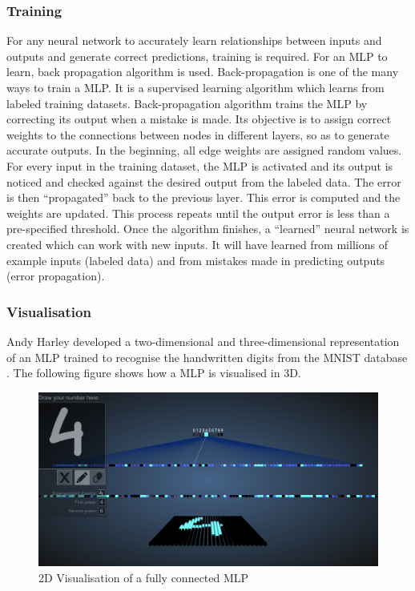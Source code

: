 \subsubsection{Training}
\label{sect5_1_1_2}
For any neural network to accurately learn relationships between inputs and outputs and generate correct predictions, training is required. For an MLP to learn, back propagation algorithm is used.\newline\newline
Back-propagation is one of the many ways to train a MLP. It is a supervised learning algorithm which learns from labeled training datasets. Back-propagation algorithm trains the MLP by correcting its output when a mistake is made. Its objective is to assign correct weights to the connections between nodes in different layers, so as to generate accurate outputs. \newline\newline
In the beginning, all edge weights are assigned random values. For every input in the training dataset, the MLP is activated and its output is noticed and checked against the desired output from the labeled data. The error is then “propagated” back to the previous layer. This error is computed and the weights are updated. This process repeats until the output error is less than a pre-specified threshold.\newline\newline
Once the algorithm finishes, a “learned” neural network is created which can work with new inputs. It will have learned from millions of example inputs (labeled data) and from mistakes made in predicting outputs (error propagation).


\subsubsection{Visualisation}
\label{sect5_1_1_3}
Andy Harley developed a two-dimensional and three-dimensional representation of an MLP trained to recognise the handwritten digits from the \ac{MNIST} database \cite{harley2015isvc}. The following figure shows how a MLP is visualised in 3D.

\begin{figure}[h!]
\centering
\includegraphics[width=12cm]{figures/Fully_Connected_MLP_3D.png}
\caption{2D Visualisation of a fully connected MLP \cite{harley2015isvc}}
\label{fig:cnn5}
\end{figure}

